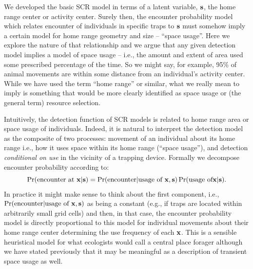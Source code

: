 We developed the basic SCR model in terms of a latent variable, ${\bf
  s}$, the home range center or activity center.  Surely then, the
encounter probability model which relates encounter of individuals in
specific traps to ${\bf s}$ must somehow imply a certain model for
home range geometry and size -- ``space usage''.  Here we explore the
nature of that relationship and we argue that any given detection
model implies a model of space usage -- i.e., the amount and extent of
area used some prescribed percentage of the time. So we might say,
for example, 95\% of animal movements are within some distance from an
individual's activity center.  While we have used the term ``home
range'' or similar, what we really mean to imply is something that
would be more clearly identified as space usage or
(the general term) resource selection. 

Intuitively, the detection function of SCR models is related to home
range area or space usage of individuals.  Indeed, it is natural
to interpret the detection model as the composite of two processes:
movement of an individual about its home range i.e., how it uses space
within its home range (``space usage''), and detection {\it
  conditional on use} in the vicinity of a trapping device.
Formally we decompose encounter probability according to:
\[
 \Pr(\mbox{encounter at } {\bf x}|{\bf s})
 = \Pr(\mbox{encounter}| \mbox{usage of } {\bf x}, {\bf s}) 
\Pr(\mbox{usage of} {\bf x}|{\bf s}).
\]
In practice it might make sense to think about the first component,
i.e., $\Pr(\mbox{encounter} | \mbox{usage of } {\bf x}, {\bf s})$ as
being a constant (e.g., if traps are located within arbitrarily small
grid cells) and then, in that case, the encounter probability model is
directly proportional to this model for individual movements about
their home range center determining the use frequency of each ${\bf x}$.
This is a sensible heuristical model for what ecologists would call a
central place forager although we have stated previously that it may
be meaningful as a description of transient space usage as well. 

